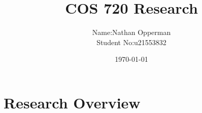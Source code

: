 \documentclass{article}
\author{\stfont \begin{tabular}{r@{ }l}
Name: &Nathan Opperman\\[1ex]
Student No:& u21553832
\end{tabular}}
\date{\today}
\title{\tfont COS 720 Research}
\begin{document}
\maketitle
\noindent
\section{\subsfont Research Overview}
\cite{Taggart2021Amazon}
{}

\end{document}
